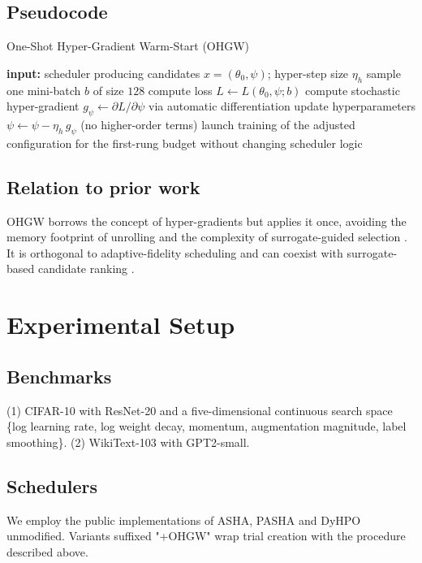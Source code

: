 \documentclass{article}
\begin{document}
\subsection{Pseudocode}
\begin{algorithm}[H]
\caption{One-Shot Hyper-Gradient Warm-Start (OHGW)}
\begin{algorithmic}[1]
  \State \textbf{input:} scheduler producing candidates $x=(\theta_0, \psi)$; hyper-step size $\eta_h$
    \State sample one mini-batch $b$ of size $128$
    \State compute loss $L \leftarrow L(\theta_0, \psi; b)$
    \State compute stochastic hyper-gradient $g_\psi \leftarrow \partial L/\partial \psi$ via automatic differentiation
    \State update hyperparameters $\psi \leftarrow \psi - \eta_h\, g_\psi$ \hfill (no higher-order terms)
    \State launch training of the adjusted configuration for the first-rung budget without changing scheduler logic
  \EndFor
\end{algorithmic}
\end{algorithm}

\subsection{Relation to prior work}
OHGW borrows the concept of hyper-gradients but applies it once, avoiding the memory footprint of unrolling \cite{bertrand-2020-implicit} and the complexity of surrogate-guided selection \cite{nguyen-2019-bayesian}. It is orthogonal to adaptive-fidelity scheduling \cite{jiang-2024-efficient} and can coexist with surrogate-based candidate ranking \cite{khazi-2023-deep}.

\section{Experimental Setup}
\subsection{Benchmarks}
(1) CIFAR-10 with ResNet-20 and a five-dimensional continuous search space \{log learning rate, log weight decay, momentum, augmentation magnitude, label smoothing\}. (2) WikiText-103 with GPT2-small.

\subsection{Schedulers}
We employ the public implementations of ASHA, PASHA and DyHPO \cite{bohdal-2022-pasha,wistuba-2022-supervising} unmodified. Variants suffixed "+OHGW" wrap trial creation with the procedure described above.
\end{document}
